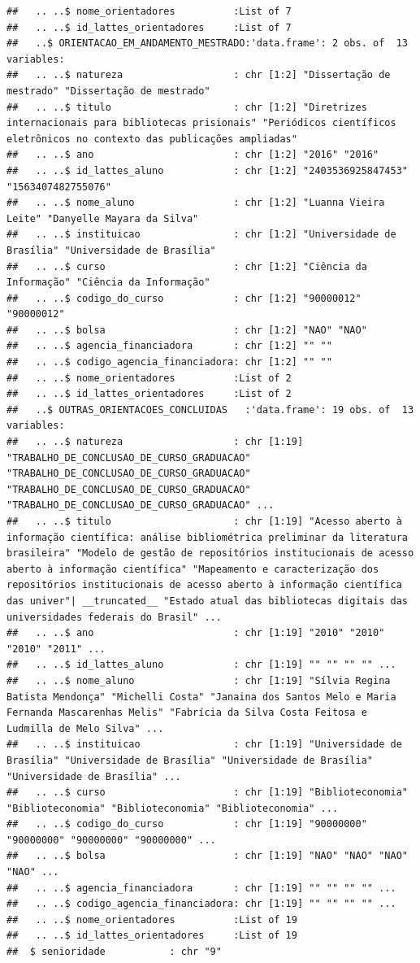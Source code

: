 \documentclass[]{article}
\begin{document}
\begin{verbatim}
##   .. ..$ nome_orientadores          :List of 7
##   .. ..$ id_lattes_orientadores     :List of 7
##   ..$ ORIENTACAO_EM_ANDAMENTO_MESTRADO:'data.frame': 2 obs. of  13 variables:
##   .. ..$ natureza                   : chr [1:2] "Dissertação de mestrado" "Dissertação de mestrado"
##   .. ..$ titulo                     : chr [1:2] "Diretrizes internacionais para bibliotecas prisionais" "Periódicos científicos eletrônicos no contexto das publicações ampliadas"
##   .. ..$ ano                        : chr [1:2] "2016" "2016"
##   .. ..$ id_lattes_aluno            : chr [1:2] "2403536925847453" "1563407482755076"
##   .. ..$ nome_aluno                 : chr [1:2] "Luanna Vieira Leite" "Danyelle Mayara da Silva"
##   .. ..$ instituicao                : chr [1:2] "Universidade de Brasília" "Universidade de Brasília"
##   .. ..$ curso                      : chr [1:2] "Ciência da Informação" "Ciência da Informação"
##   .. ..$ codigo_do_curso            : chr [1:2] "90000012" "90000012"
##   .. ..$ bolsa                      : chr [1:2] "NAO" "NAO"
##   .. ..$ agencia_financiadora       : chr [1:2] "" ""
##   .. ..$ codigo_agencia_financiadora: chr [1:2] "" ""
##   .. ..$ nome_orientadores          :List of 2
##   .. ..$ id_lattes_orientadores     :List of 2
##   ..$ OUTRAS_ORIENTACOES_CONCLUIDAS   :'data.frame': 19 obs. of  13 variables:
##   .. ..$ natureza                   : chr [1:19] "TRABALHO_DE_CONCLUSAO_DE_CURSO_GRADUACAO" "TRABALHO_DE_CONCLUSAO_DE_CURSO_GRADUACAO" "TRABALHO_DE_CONCLUSAO_DE_CURSO_GRADUACAO" "TRABALHO_DE_CONCLUSAO_DE_CURSO_GRADUACAO" ...
##   .. ..$ titulo                     : chr [1:19] "Acesso aberto à informação científica: análise bibliométrica preliminar da literatura brasileira" "Modelo de gestão de repositórios institucionais de acesso aberto à informação científica" "Mapeamento e caracterização dos repositórios institucionais de acesso aberto à informação científica das univer"| __truncated__ "Estado atual das bibliotecas digitais das universidades federais do Brasil" ...
##   .. ..$ ano                        : chr [1:19] "2010" "2010" "2010" "2011" ...
##   .. ..$ id_lattes_aluno            : chr [1:19] "" "" "" "" ...
##   .. ..$ nome_aluno                 : chr [1:19] "Sílvia Regina Batista Mendonça" "Michelli Costa" "Janaina dos Santos Melo e Maria Fernanda Mascarenhas Melis" "Fabrícia da Silva Costa Feitosa e Ludmilla de Melo Silva" ...
##   .. ..$ instituicao                : chr [1:19] "Universidade de Brasília" "Universidade de Brasília" "Universidade de Brasília" "Universidade de Brasília" ...
##   .. ..$ curso                      : chr [1:19] "Biblioteconomia" "Biblioteconomia" "Biblioteconomia" "Biblioteconomia" ...
##   .. ..$ codigo_do_curso            : chr [1:19] "90000000" "90000000" "90000000" "90000000" ...
##   .. ..$ bolsa                      : chr [1:19] "NAO" "NAO" "NAO" "NAO" ...
##   .. ..$ agencia_financiadora       : chr [1:19] "" "" "" "" ...
##   .. ..$ codigo_agencia_financiadora: chr [1:19] "" "" "" "" ...
##   .. ..$ nome_orientadores          :List of 19
##   .. ..$ id_lattes_orientadores     :List of 19
##  $ senioridade           : chr "9"
\end{verbatim}
\end{document}

